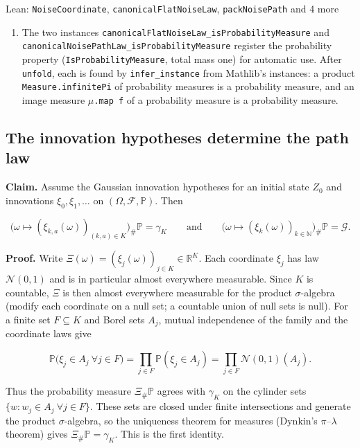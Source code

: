 \documentclass[11pt,a4paper]{report}
\begin{document}
\begin{leanbox}{Lean: \texttt{NoiseCoordinate}, \texttt{canonicalFlatNoiseLaw}, \texttt{packNoisePath} and 4 more}
\begin{enumerate}
\item The two instances \texttt{canonical\allowbreak{}Flat\allowbreak{}Noise\allowbreak{}Law\_\allowbreak{}is\allowbreak{}Probability\allowbreak{}Measure} and \texttt{canonical\allowbreak{}Noise\allowbreak{}Path\allowbreak{}Law\_\allowbreak{}is\allowbreak{}Probability\allowbreak{}Measure} register the probability property (\texttt{Is\allowbreak{}Probability\allowbreak{}Measure}, total mass one) for automatic use. After \texttt{unfold}, each is found by \texttt{infer\_\allowbreak{}instance} from Mathlib's instances: a product \texttt{Measure.\allowbreak{}infinite\allowbreak{}Pi} of probability measures is a probability measure, and an image measure \texttt{\ensuremath{\mu}.\allowbreak{}map f} of a probability measure is a probability measure.

\end{enumerate}
\end{leanbox}
\subsection{\texorpdfstring{The innovation hypotheses determine the path law}{The innovation hypotheses determine the path law}}
\label{report-step-IPLA-AlgorithmLaw-lean-2}


\textbf{Claim.} Assume the Gaussian innovation hypotheses for an initial state \(Z_0\) and innovations \(\xi_0,\xi_1,\dots\) on \((\Omega,\mathcal F,\mathbb P)\). Then


\[\bigl(\omega\mapsto(\xi_{k,a}(\omega))_{(k,a)\in K}\bigr)_\#\mathbb P=\gamma_K\qquad\text{and}\qquad\bigl(\omega\mapsto(\xi_k(\omega))_{k\in\mathbb N}\bigr)_\#\mathbb P=\mathcal G .\]


\textbf{Proof.} Write \(\Xi(\omega)=(\xi_j(\omega))_{j\in K}\in\mathbb R^K\). Each coordinate \(\xi_j\) has law \(\mathcal N(0,1)\) and is in particular almost everywhere measurable. Since \(K\) is countable, \(\Xi\) is then almost everywhere measurable for the product \(\sigma\)-algebra (modify each coordinate on a null set; a countable union of null sets is null). For a finite set \(F\subseteq K\) and Borel sets \(A_j\), mutual independence of the family and the coordinate laws give


\[\mathbb P\bigl(\xi_j\in A_j\ \forall j\in F\bigr)=\prod_{j\in F}\mathbb P(\xi_j\in A_j)=\prod_{j\in F}\mathcal N(0,1)(A_j).\]


Thus the probability measure \(\Xi_\#\mathbb P\) agrees with \(\gamma_K\) on the cylinder sets \(\{w:w_j\in A_j\ \forall j\in F\}\). These sets are closed under finite intersections and generate the product \(\sigma\)-algebra, so the uniqueness theorem for measures (Dynkin's \(\pi\)–\(\lambda\) theorem) gives \(\Xi_\#\mathbb P=\gamma_K\). This is the first identity.
\end{document}
